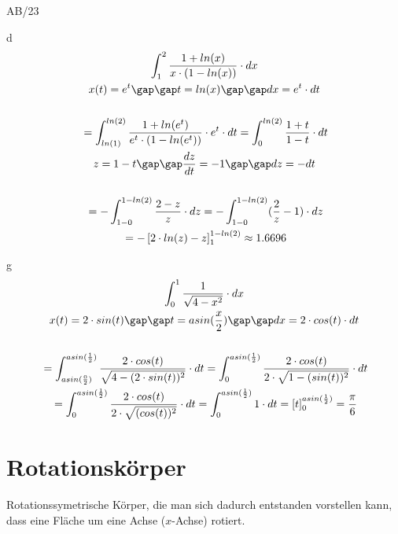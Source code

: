 \begin{exercise}{AB/23}
  \item [d]
  \begin{gather*}
    \int_1^2 \frac{1 + ln(x)}{x \cdot (1 - ln(x))} \cdot dx \\
    x(t) = e^t \gap\gap t = ln(x) \gap\gap dx = e^t \cdot dt \\\\
    \;= \int_{ln(1)}^{ln(2)} \frac{1 + ln(e^t)}{e^t \cdot (1 - ln(e^t))} \cdot e^t \cdot dt = \int_0^{ln(2)} \frac{1 + t}{1 - t} \cdot dt \\
    z = 1 - t \gap\gap \frac{dz}{dt} = -1 \gap\gap dz = -dt \\\\
    \;= -\int_{1 - 0}^{1 - ln(2)} \frac{2 - z}{z} \cdot dz = -\int_{1 - 0}^{1 - ln(2)} (\frac{2}{z} - 1) \cdot dz \\
    \;= -\left[2 \cdot ln(z) - z\right]_1^{1 - ln(2)} \approx 1.6696
  \end{gather*}
  \item [g]
  \begin{gather*}
    \int_0^1 \frac{1}{\sqrt{4 - x^2}} \cdot dx \\
    x(t) = 2 \cdot sin(t) \gap\gap t = asin(\frac{x}{2}) \gap\gap dx = 2 \cdot cos(t) \cdot dt \\\\
    \;= \int_{asin(\frac{0}{2})}^{asin(\frac{1}{2})} \frac{2 \cdot cos(t)}{\sqrt{4 - (2 \cdot sin(t))^2}} \cdot dt = \int_0^{asin(\frac{1}{2})} \frac{2 \cdot cos(t)}{2 \cdot \sqrt{1 - (sin(t))^2}} \cdot dt \\
    \;= \int_0^{asin(\frac{1}{2})} \frac{2 \cdot cos(t)}{2 \cdot \sqrt{(cos(t))^2}} \cdot dt = \int_0^{asin(\frac{1}{2})} 1 \cdot dt = \left[t\right]_0^{asin(\frac{1}{2})} = \frac{\pi}{6}
  \end{gather*}
\end{exercise}
\section{Rotationskörper}
Rotationssymetrische Körper, die man sich dadurch entstanden vorstellen kann, dass eine Fläche um eine Achse ($x$-Achse) rotiert.
